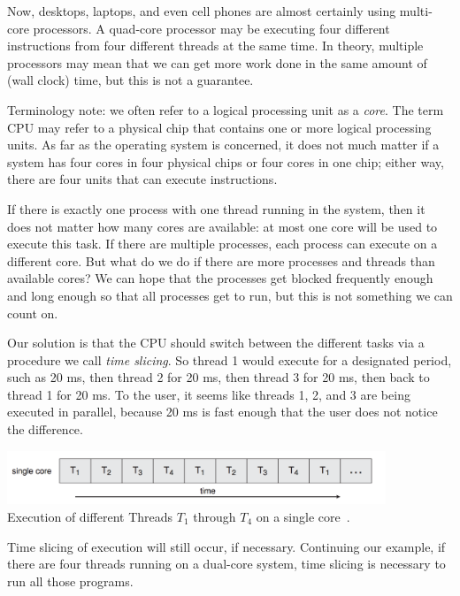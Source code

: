 Now, desktops, laptops, and even cell phones are almost certainly using multi-core processors. A quad-core processor may be executing four different instructions from four different threads at the same time. In theory, multiple processors may mean that we can get more work done in the same amount of (wall clock) time, but this is not a guarantee.

Terminology note: we often refer to a logical processing unit as a \textit{core}. The term CPU may refer to a physical chip that contains one or more logical processing units. As far as the operating system is concerned, it does not much matter if a system has four cores in four physical chips or four cores in one chip; either way, there are four units that can execute instructions.

If there is exactly one process with one thread running in the system, then it does not matter how many cores are available: at most one core will be used to execute this task. If there are multiple processes, each process can execute on a different core. But what do we do if there are more processes and threads than available cores? We can hope that the processes get blocked frequently enough and long enough so that all processes get to run, but this is not something we can count on.

Our solution is that the CPU should switch between the different tasks via a procedure we call \textit{time slicing}. So thread 1 would execute for a designated period, such as 20 ms, then thread 2 for 20 ms, then thread 3 for 20 ms, then back to thread 1 for 20 ms. To the user, it seems like threads 1, 2, and 3 are being executed in parallel, because 20 ms is fast enough that the user does not notice the difference.

\begin{center}
	\includegraphics[width=0.85\textwidth]{images/single-core-execution.png}\\
	Execution of different Threads $T_{1}$ through $T_{4}$ on a single core~\cite{osc}.
\end{center}

Time slicing of execution will still occur, if necessary. Continuing our example, if there are four threads running on a dual-core system, time slicing is necessary to run all those programs.

